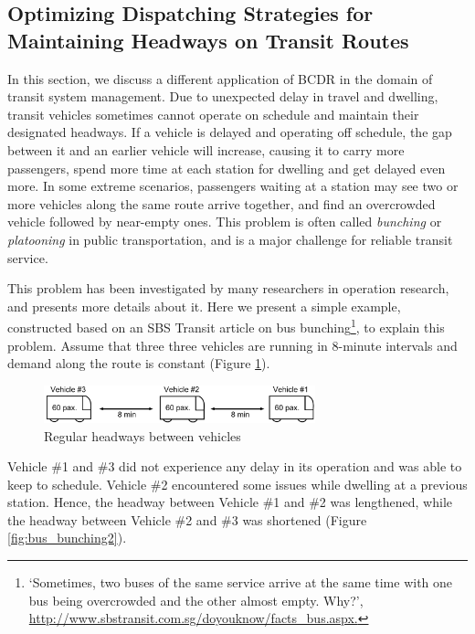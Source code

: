 \documentclass[jair,twoside,11pt,theapa]{article}
\begin{document}
\subsection{Optimizing Dispatching Strategies for Maintaining Headways on Transit Routes}


In this section, we discuss a different application of BCDR in the domain of
transit system management. Due to unexpected delay in travel and dwelling,
transit vehicles sometimes cannot operate on schedule and maintain their
designated headways. If a vehicle is delayed and operating off schedule, the gap
between it and an earlier vehicle will increase, causing it to carry more
passengers, spend more time at each station for dwelling and get delayed even
more. In some extreme scenarios, passengers waiting at a station may see two or
more vehicles along the same route arrive together, and find an overcrowded
vehicle followed by near-empty ones. This problem is often called
\textit{bunching} or \textit{platooning} in public transportation, and is a
major challenge for reliable transit service.


This problem has been investigated by many researchers in operation research,
and  presents more details about it. Here we present a
simple example, constructed based on an SBS Transit article on bus
bunching\footnote{`Sometimes, two buses of the same service arrive at the same
time with one bus being overcrowded and the other almost empty. Why?',
\url{http://www.sbstransit.com.sg/doyouknow/facts_bus.aspx.}}, to explain this
problem. Assume that three three vehicles are running in 8-minute intervals and
demand along the route is constant (Figure \ref{fig:bus_bunching1}).


\begin{figure}[htb]
	\centering
	\includegraphics[width=0.7\textwidth]{figures/MBTA/bunching1.pdf}
	\caption{Regular headways between vehicles}
	\label{fig:bus_bunching1}
\end{figure}

Vehicle \#1 and \#3 did not experience any delay in its operation and was able
to keep to schedule. Vehicle \#2 encountered some issues while dwelling at a
previous station. Hence, the headway between Vehicle \#1 and \#2 was lengthened,
while the headway between Vehicle \#2 and \#3 was shortened (Figure \ref{fig:bus_bunching2}).
\end{document}
